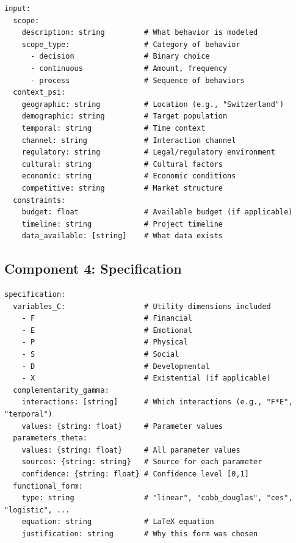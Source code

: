 \begin{tcolorbox}[colback=yellow!5!white, colframe=yellow!75!black,
    title=Schema: Input]
\begin{verbatim}
input:
  scope:
    description: string         # What behavior is modeled
    scope_type:                 # Category of behavior
      - decision                # Binary choice
      - continuous              # Amount, frequency
      - process                 # Sequence of behaviors
  context_psi:
    geographic: string          # Location (e.g., "Switzerland")
    demographic: string         # Target population
    temporal: string            # Time context
    channel: string             # Interaction channel
    regulatory: string          # Legal/regulatory environment
    cultural: string            # Cultural factors
    economic: string            # Economic conditions
    competitive: string         # Market structure
  constraints:
    budget: float               # Available budget (if applicable)
    timeline: string            # Project timeline
    data_available: [string]    # What data exists
\end{verbatim}
\end{tcolorbox}

\subsection{Component 4: Specification}

\begin{tcolorbox}[colback=orange!5!white, colframe=orange!75!black,
    title=Schema: Specification]
\begin{verbatim}
specification:
  variables_C:                  # Utility dimensions included
    - F                         # Financial
    - E                         # Emotional
    - P                         # Physical
    - S                         # Social
    - D                         # Developmental
    - X                         # Existential (if applicable)
  complementarity_gamma:
    interactions: [string]      # Which interactions (e.g., "F*E", "temporal")
    values: {string: float}     # Parameter values
  parameters_theta:
    values: {string: float}     # All parameter values
    sources: {string: string}   # Source for each parameter
    confidence: {string: float} # Confidence level [0,1]
  functional_form:
    type: string                # "linear", "cobb_douglas", "ces", "logistic", ...
    equation: string            # LaTeX equation
    justification: string       # Why this form was chosen
\end{verbatim}
\end{tcolorbox}

